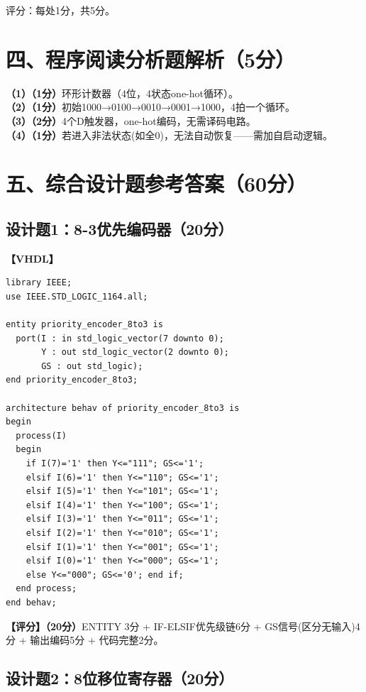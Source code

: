{\centering 评分：每处1分，共5分。\par}

\section{四、程序阅读分析题解析（5分）}

\textbf{（1）（1分）}环形计数器（4位，4状态one-hot循环）。\\
\textbf{（2）（1分）}初始1000→0100→0010→0001→1000，4拍一个循环。\\
\textbf{（3）（2分）}4个D触发器，one-hot编码，无需译码电路。\\
\textbf{（4）（1分）}若进入非法状态(如全0)，无法自动恢复——需加自启动逻辑。

\section{五、综合设计题参考答案（60分）}

\subsection{设计题1：8-3优先编码器（20分）}

\textbf{【VHDL】}
\begin{lstlisting}
library IEEE;
use IEEE.STD_LOGIC_1164.all;

entity priority_encoder_8to3 is
  port(I : in std_logic_vector(7 downto 0);
       Y : out std_logic_vector(2 downto 0);
       GS : out std_logic);
end priority_encoder_8to3;

architecture behav of priority_encoder_8to3 is
begin
  process(I)
  begin
    if I(7)='1' then Y<="111"; GS<='1';
    elsif I(6)='1' then Y<="110"; GS<='1';
    elsif I(5)='1' then Y<="101"; GS<='1';
    elsif I(4)='1' then Y<="100"; GS<='1';
    elsif I(3)='1' then Y<="011"; GS<='1';
    elsif I(2)='1' then Y<="010"; GS<='1';
    elsif I(1)='1' then Y<="001"; GS<='1';
    elsif I(0)='1' then Y<="000"; GS<='1';
    else Y<="000"; GS<='0'; end if;
  end process;
end behav;
\end{lstlisting}

\textbf{【评分】（20分）}ENTITY 3分 + IF-ELSIF优先级链6分 + GS信号(区分无输入)4分 + 输出编码5分 + 代码完整2分。

\subsection{设计题2：8位移位寄存器（20分）}

